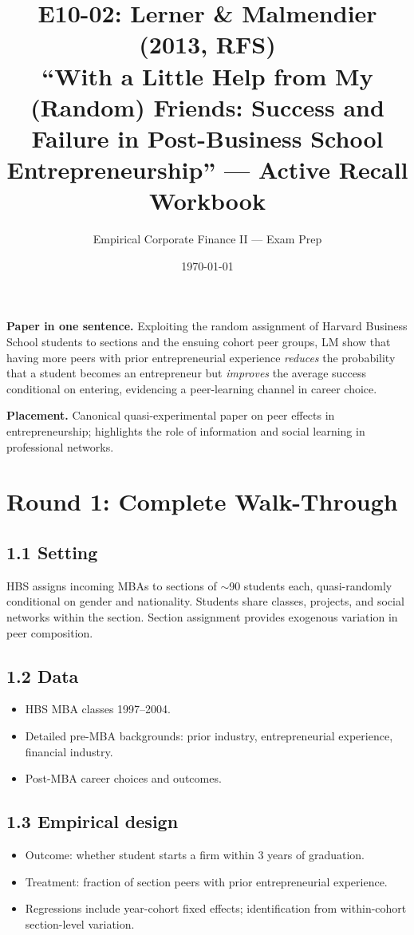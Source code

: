 \documentclass[11pt]{article}
\title{E10-02: Lerner \& Malmendier (2013, RFS) \\
\large ``With a Little Help from My (Random) Friends: Success and Failure in Post-Business School Entrepreneurship'' --- Active Recall Workbook}
\author{Empirical Corporate Finance II --- Exam Prep}
\date{\today}
\begin{document}
\maketitle

\begin{keybox}
\textbf{Paper in one sentence.} Exploiting the random assignment of Harvard Business School students to sections and the ensuing cohort peer groups, LM show that having more peers with prior entrepreneurial experience \emph{reduces} the probability that a student becomes an entrepreneur but \emph{improves} the average success conditional on entering, evidencing a peer-learning channel in career choice.

\textbf{Placement.} Canonical quasi-experimental paper on peer effects in entrepreneurship; highlights the role of information and social learning in professional networks.
\end{keybox}

\section*{Round 1: Complete Walk-Through}

\subsection*{1.1 Setting}
HBS assigns incoming MBAs to sections of $\sim$90 students each, quasi-randomly conditional on gender and nationality. Students share classes, projects, and social networks within the section. Section assignment provides exogenous variation in peer composition.

\subsection*{1.2 Data}
\begin{itemize}
\item HBS MBA classes 1997--2004.
\item Detailed pre-MBA backgrounds: prior industry, entrepreneurial experience, financial industry.
\item Post-MBA career choices and outcomes.
\end{itemize}

\subsection*{1.3 Empirical design}
\begin{itemize}
\item Outcome: whether student starts a firm within 3 years of graduation.
\item Treatment: fraction of section peers with prior entrepreneurial experience.
\item Regressions include year-cohort fixed effects; identification from within-cohort section-level variation.
\end{itemize}
\end{document}
